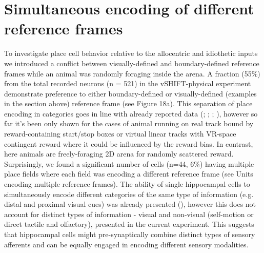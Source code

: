 \section{Simultaneous encoding of different reference frames}
\label{sec:integration_of_sm_imputs}

To investigate place cell behavior relative to the allocentric and idiothetic inputs we introduced a conflict between visually-defined and boundary-defined reference frames while an animal was randomly foraging inside the arena. A fraction (55\%) from the total recorded neurons (n = 521) in the vSHIFT-physical experiment demonstrate preference to either boundary-defined or visually-defined (examples in the section above) reference frame (see Figure 18a). This separation of place encoding in categories goes in line with already reported data (\cite{Mcnaughton1996}; \cite{Aronov2014}; \cite{Chen2013}; \cite{Haas2019}), however so far it’s been only shown for the cases of animal running on real track bound by reward-containing start/stop boxes or virtual linear tracks with VR-space contingent reward where it could be influenced by the reward bias. In contrast, here animals are freely-foraging  2D arena  for randomly scattered reward. Surprisingly, we found a significant number of cells (n=44, 6\%) having multiple place fields where each field was encoding a different reference frame (see Units encoding multiple reference frames). The ability of single hippocampal cells to simultaneously encode different categories of the same type of information (e.g. distal and proximal visual cues) was already presented (\cite{Knierim2002}), however this does not account for distinct types of information - visual and non-visual (self-motion or direct tactile and olfactory), presented in the current experiment. This suggests that hippocampal cells might pre-synaptically combine distinct types of sensory afferents and can be equally engaged in encoding different sensory modalities.


